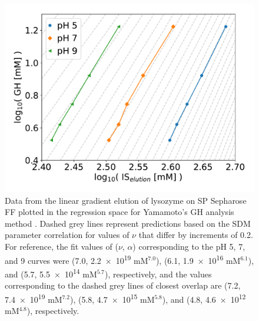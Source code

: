 \documentclass[11pt,a4paper]{article}
\providecommand{\DIFaddtex}[1]{{\sf #1}} %
\providecommand{\DIFaddFL}[1]{\DIFadd{#1}} %
\providecommand{\DIFaddbeginFL}{} %
\providecommand{\DIFaddendFL}{} %
\providecommand{\DIFdelbeginFL}{} %
\providecommand{\DIFdelendFL}{} %
\providecommand{\DIFadd}[1]{\texorpdfstring{\DIFaddtex{#1}}{#1}} %
\begin{document}
\begin{figure}[htbp]
    \centering
    \DIFdelbeginFL %
\DIFdelendFL \DIFaddbeginFL \includegraphics[width=\textwidth]{figure_8}
    \DIFaddendFL \caption{
    Data from the linear gradient elution of lysozyme on SP Sepharose FF plotted in the regression space for Yamamoto's GH analysis method \cite{main-Yamamoto1987}. Dashed grey lines represent predictions based on the SDM parameter correlation for values of $\nu$ that differ by increments of 0.2\DIFaddbeginFL \DIFaddFL{. For reference, the fit values of ($\nu$, $\alpha$) corresponding to the pH 5, 7, and 9 curves were (7.0, }\num{2.2e+19} \DIFaddFL{mM$^{7.0}$), (6.1, }\num{1.9e+16} \DIFaddFL{mM$^{6.1}$), and (5.7, }\num{5.5e+14} \DIFaddFL{mM$^{5.7}$), respectively, and the values corresponding to the dashed grey lines of closest overlap are (7.2, }\num{7.4e19} \DIFaddFL{mM$^{7.2}$), (5.8, }\num{4.7e15} \DIFaddFL{mM$^{5.8}$), and (4.8, }\num{4.6e12} \DIFaddFL{mM$^{4.8}$), respectively}\DIFaddendFL .
    }
    \label{fig:lge overlay}
\end{figure}
\end{document}
